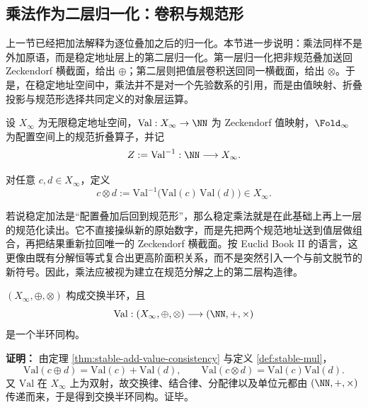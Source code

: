 \subsection{乘法作为二层归一化：卷积与规范形}\label{subsec:emergent-arithmetic-stable-mul}

上一节已经把加法解释为逐位叠加之后的归一化。本节进一步说明：乘法同样不是外加原语，而是稳定地址层上的第二层归一化。第一层归一化把非规范叠加送回 Zeckendorf 横截面，给出 \(\oplus\)；第二层则把值层卷积送回同一横截面，给出 \(\otimes\)。于是，在稳定地址空间中，乘法并不是对一个先验数系的引用，而是由值映射、折叠投影与规范形选择共同定义的对象层运算。

设 \(X_\infty\) 为无限稳定地址空间，\(\mathrm{Val}:X_\infty\to\NN\) 为 Zeckendorf 值映射，\(\Fold_\infty\) 为配置空间上的规范折叠算子，并记
\[
Z:=\mathrm{Val}^{-1}: \NN\longrightarrow X_\infty.
\]

\begin{definition}[稳定乘法]\label{def:stable-mul}
对任意 \(c,d\in X_\infty\)，定义
\[
c\otimes d:=\mathrm{Val}^{-1}\!\bigl(\mathrm{Val}(c)\,\mathrm{Val}(d)\bigr)\in X_\infty.
\]
\end{definition}

\begin{remark}[乘法是第二层规范化]\label{rem:stable-mul-second-layer-normalization}
若说稳定加法是“配置叠加后回到规范形”，那么稳定乘法就是在此基础上再上一层的规范化读出。它不直接操纵新的原始数字，而是先把两个规范地址送到值层做组合，再把结果重新拉回唯一的 Zeckendorf 横截面。按 Euclid Book II 的语言，这更像由既有分解恒等式复合出更高阶面积关系，而不是突然引入一个与前文脱节的新符号。因此，乘法应被视为建立在规范分解之上的第二层构造律。
\end{remark}

\begin{theorem}[乘法的定义性同构]\label{thm:mul-definitional}
\((X_\infty,\oplus,\otimes)\) 构成交换半环，且
\[
\mathrm{Val}:(X_\infty,\oplus,\otimes)\longrightarrow (\NN,+,\times)
\]
是一个半环同构。
\end{theorem}

\textbf{证明：}
由定理 \ref{thm:stable-add-value-consistency} 与定义 \ref{def:stable-mul}，
\[
\mathrm{Val}(c\oplus d)=\mathrm{Val}(c)+\mathrm{Val}(d),\qquad
\mathrm{Val}(c\otimes d)=\mathrm{Val}(c)\mathrm{Val}(d).
\]
又 \(\mathrm{Val}\) 在 \(X_\infty\) 上为双射，故交换律、结合律、分配律以及单位元都由 \((\NN,+,\times)\) 传递而来，于是得到交换半环同构。证毕。


